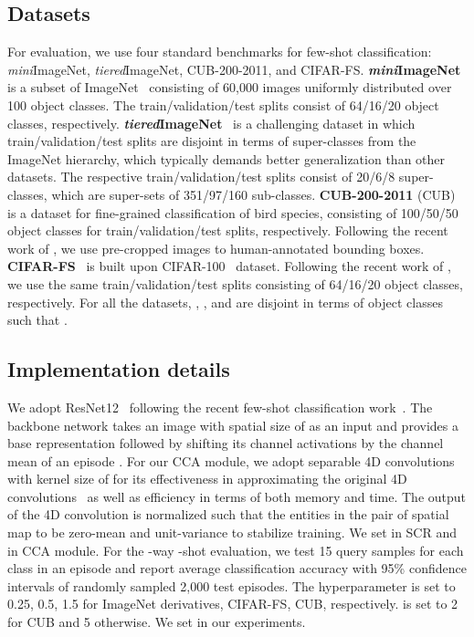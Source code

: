 \documentclass[10pt,twocolumn,letterpaper]{article}
\newcommand{\itmini}{\textit{mini}}
\newcommand{\ittiered}{\textit{tiered}}
\newcommand{\abbself}{SCR\xspace}
\newcommand{\abbcross}{CCA\xspace}
\begin{document}
\subsection{Datasets}
For evaluation, we use four standard benchmarks for few-shot classification: \itmini ImageNet, \ittiered ImageNet, CUB-200-2011, and CIFAR-FS.
\textbf{\itmini ImageNet}~\cite{matchingnet} is a subset of ImageNet~\cite{russakovsky2015imagenet} consisting of 60,000 images uniformly distributed over 100 object classes.
The train/validation/test splits consist of 64/16/20 object classes, respectively.
\textbf{\ittiered ImageNet}~\cite{tieredimagenet} is a challenging dataset in which train/validation/test splits are disjoint in terms of super-classes from the ImageNet hierarchy, which typically demands better generalization than other datasets.
The respective train/validation/test splits consist of 20/6/8 super-classes, which are super-sets of 351/97/160 sub-classes.
\textbf{CUB-200-2011} (CUB)~\cite{cub} is a dataset for fine-grained classification of bird species, consisting of 100/50/50 object classes for train/validation/test splits, respectively.
Following the recent work of \cite{deepemd, feat}, we use pre-cropped images to human-annotated bounding boxes.
\textbf{CIFAR-FS}~\cite{cifarfs} is built upon CIFAR-100~\cite{cifar} dataset. 
Following the recent work of \cite{cifarfs}, we use the same train/validation/test splits consisting of 64/16/20 object classes, respectively.
For all the datasets, , , and  are disjoint in terms of object classes such that .








\subsection{Implementation details}
We adopt ResNet12~\cite{resnet} following the recent few-shot classification work~\cite{shotfree, tadam, feat, deepemd}.
The backbone network takes an image with spatial size of  as an input and provides a base representation  followed by shifting its channel activations by the channel mean of an episode \cite{deepemd}.
For our CCA module, we adopt separable 4D convolutions~\cite{vcn} with kernel size of  for its effectiveness in approximating the original 4D convolutions~\cite{ncnet} as well as efficiency in terms of both memory and time.
The output of the 4D convolution  is normalized such that the entities in the pair of spatial map to be zero-mean and unit-variance to stabilize training.
We set  in \abbself and  in \abbcross module.
For the -way -shot evaluation, we test 15 query samples for each class in an episode and report average classification accuracy with 95\% confidence intervals of randomly sampled 2,000 test episodes.
The hyperparameter  is set to 0.25, 0.5, 1.5 for ImageNet derivatives, CIFAR-FS, CUB, respectively.
 is set to 2 for CUB and 5 otherwise.
We set  in our experiments.
\end{document}
